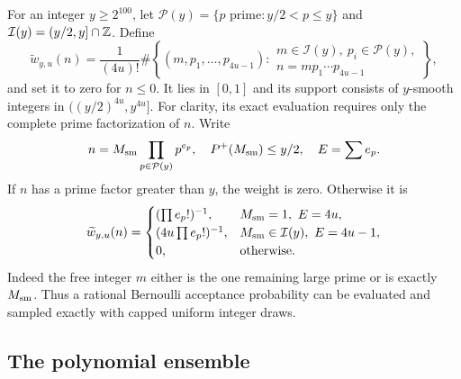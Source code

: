 For an integer $y\ge2^{100}$, let
$\mathcal P(y)=\{p\text{ prime}:y/2<p\le y\}$ and
$\mathcal I(y)=(y/2,y]\cap\mathbb Z$.  Define
\begin{equation}
 \widetilde w_{y,u}(n)=\frac1{(4u)!}
 \#\left\{(m,p_1,\ldots,p_{4u-1}):
 \begin{array}{l}
 m\in\mathcal I(y),\ p_i\in\mathcal P(y),\\
 n=mp_1\cdots p_{4u-1}
 \end{array}\right\},
 \label{rf:weight}
\end{equation}
and set it to zero for $n\le0$.  It lies in $[0,1]$ and its support
consists of $y$-smooth integers in $((y/2)^{4u},y^{4u}]$.
For clarity, its exact evaluation requires only the complete prime
factorization of $n$.  Write
\[
 n=M_{\rm sm}\prod_{p\in\mathcal P(y)}p^{e_p},
 \quad P^+(M_{\rm sm})\le y/2,\quad E=\sum e_p.
\]
If $n$ has a prime factor greater than $y$, the weight is zero.
Otherwise it is
\begin{equation}
 \widetilde w_{y,u}(n)=
 \begin{cases}
 (\prod e_p!)^{-1},&M_{\rm sm}=1,\ E=4u,\\
 (4u\prod e_p!)^{-1},&M_{\rm sm}\in\mathcal I(y),\ E=4u-1,\\
 0,&\text{otherwise}.
 \end{cases}
 \label{rf:weightformula}
\end{equation}
Indeed the free integer $m$ either is the one remaining large prime
or is exactly $M_{\rm sm}$.  Thus a rational Bernoulli acceptance
probability can be evaluated and sampled exactly with capped uniform
integer draws.

\subsection{The polynomial ensemble}

